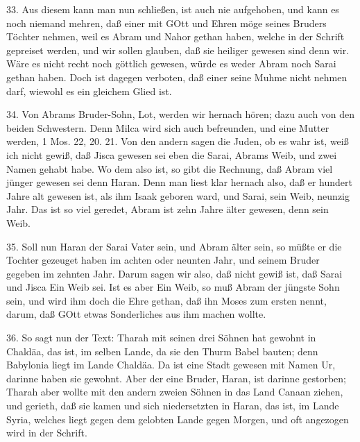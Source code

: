 33. Aus diesem kann man nun schließen, ist auch nie aufgehoben, und kann es noch niemand mehren, daß einer mit GOtt und Ehren möge seines Bruders Töchter nehmen, weil es Abram und Nahor gethan haben, welche in der Schrift gepreiset werden, und wir sollen glauben, daß sie heiliger gewesen sind denn wir. Wäre es nicht recht noch göttlich gewesen, würde es weder Abram noch Sarai gethan haben. Doch ist dagegen verboten, daß einer seine Muhme nicht nehmen darf, wiewohl es ein gleichem Glied ist.

34. Von Abrams Bruder-Sohn, Lot, werden wir hernach hören; dazu auch von den beiden Schwestern. Denn Milca wird sich auch befreunden, und eine Mutter werden, 1 Mos. 22, 20. 21. Von den andern sagen die Juden, ob es wahr ist, weiß ich nicht gewiß, daß Jisca gewesen sei eben die Sarai, Abrams Weib, und zwei Namen gehabt habe. Wo dem also ist, so gibt die Rechnung, daß Abram viel jünger gewesen sei denn Haran. Denn man liest klar hernach also, daß er hundert Jahre alt gewesen ist, als ihm Isaak geboren ward, und Sarai, sein Weib, neunzig Jahr. Das ist so viel geredet, Abram ist zehn Jahre älter gewesen, denn sein Weib.

35. Soll nun Haran der Sarai Vater sein, und Abram älter sein, so müßte er die Tochter gezeuget haben im achten oder neunten Jahr, und seinem Bruder gegeben im zehnten Jahr. Darum sagen wir also, daß nicht gewiß ist, daß Sarai und Jisca Ein Weib sei. Ist es aber Ein Weib, so muß Abram der jüngste Sohn sein, und wird ihm doch die Ehre gethan, daß ihn Moses zum ersten nennt, darum, daß GOtt etwas Sonderliches aus ihm machen wollte.

36. So sagt nun der Text: Tharah mit seinen drei Söhnen hat gewohnt in Chaldäa, das ist, im selben Lande, da sie den Thurm Babel bauten; denn Babylonia liegt im Lande Chaldäa. Da ist eine Stadt gewesen mit Namen Ur, darinne haben sie gewohnt. Aber der eine Bruder, Haran, ist darinne gestorben; Tharah aber wollte mit den andern zweien Söhnen in das Land Canaan ziehen, und gerieth, daß sie kamen und sich niedersetzten in Haran, das ist, im Lande Syria, welches liegt gegen dem gelobten Lande gegen Morgen, und oft angezogen wird in der Schrift.

